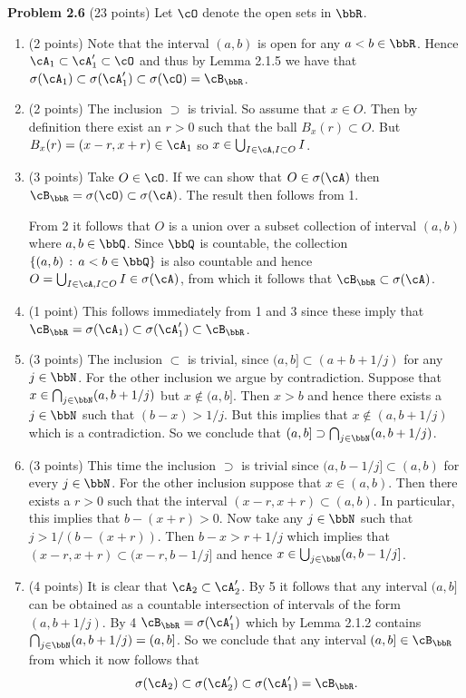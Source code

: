 \textbf{Problem 2.6} (23 points)
Let $\cO$ denote the open sets in $\bbR$.
\begin{enumerate}[label=(\alph*)]
\item (2 points) Note that the interval $(a,b)$ is open for any $a < b \in \bbR$. Hence $\cA_1 \subset \cA_1^\prime \subset \cO$ and thus by Lemma 2.1.5 we have that $\sigma(\cA_1) \subset \sigma(\cA_1^\prime) \subset \sigma(\cO) = \cB_\bbR$.
\item (2 points) The inclusion $\supset$ is trivial. So assume that $x \in O$. Then by definition there exist an $r > 0$ such that the ball $B_x(r) \subset O$. But $B_x(r) = (x-r, x+r) \in \cA_1$ so $x \in \bigcup_{I \in \cA, I \subset O} I$.
\item (3 points) Take $O \in \cO$. If we can show that $O \in \sigma(\cA)$ then $\cB_\bbR = \sigma(\cO) \subset \sigma(\cA)$. The result then follows from 1. 

From 2 it follows that $O$ is a union over a subset collection of interval $(a,b)$ where $a,b \in \bbQ$. Since $\bbQ$ is countable, the collection $\{(a,b) \, : \, a < b \in \bbQ\}$ is also countable and hence $O = \bigcup_{I \in \cA, I \subset O} I \in \sigma(\cA)$, from which it follows that $\cB_\bbR \subset \sigma(\cA)$.
\item (1 point) This follows immediately from 1 and 3 since these imply that $\cB_\bbR = \sigma(\cA_1) \subset \sigma(\cA_1^\prime) \subset \cB_\bbR$.
\item (3 points) The inclusion $\subset$ is trivial, since $(a,b] \subset (a + b +1/j)$ for any $j \in \bbN$. For the other inclusion we argue by contradiction. Suppose that $x \in \bigcap_{j \in \bbN} (a,b+1/j)$ but $x \notin (a,b]$. Then $x > b$ and hence there exists a $j \in \bbN$ such that $(b-x) > 1/j$. But this implies that $x \notin (a,b+1/j)$ which is a contradiction. So we conclude that $(a,b] \supset \bigcap_{j \in \bbN} (a,b+1/j)$.
\item (3 points) This time the inclusion $\supset$ is trivial since $(a,b-1/j] \subset (a,b)$ for every $j \in \bbN$. For the other inclusion suppose that $x \in (a,b)$. Then there exists a $r > 0$ such that the interval $(x-r,x+r) \subset (a,b)$. In particular, this implies that $b - (x+r) > 0$. Now take any $j \in \bbN$ such that $j >1/(b - (x+r))$. Then $b - x > r + 1/j$ which implies that $(x-r,x+r) \subset (x-r,b-1/j]$ and hence $x \in \bigcup_{j \in \bbN} (a,b-1/j]$.
\item (4 points) It is clear that $\cA_2 \subset \cA_2^\prime$. By 5 it follows that any interval $(a,b]$ can be obtained as a countable intersection of intervals of the form $(a,b+1/j)$. By 4 $\cB_\bbR = \sigma(\cA_1^\prime)$ which by Lemma 2.1.2 contains $\bigcap_{j \in \bbN} (a,b+1/j) = (a,b]$. So we conclude that any interval $(a,b] \in \cB_\bbR$ from which it now follows that
\[
	\sigma(\cA_2) \subset \sigma(\cA_2^\prime) \subset \sigma(\cA_1^\prime) = \cB_\bbR.
\]


\end{enumerate}
